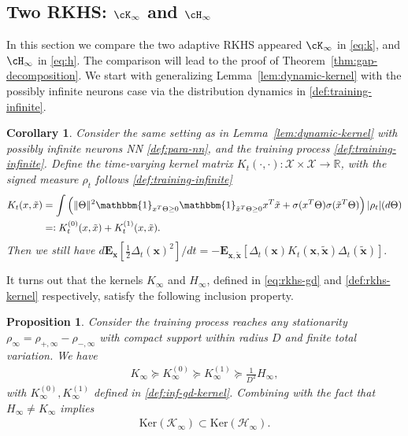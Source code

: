 \documentclass[11pt]{article}
\numberwithin{equation}{section}
\newtheorem{corollary}{Corollary}[section]
\newtheorem{proposition}{Proposition}[section]
\def\bd#1{\mathbf{#1}}
\begin{document}
\subsection{Two RKHS: $\cK_\infty$ and $\cH_\infty$}


In this section we compare the two adaptive RKHS appeared $\cK_\infty$ in \eqref{eq:k}, and $\cH_\infty$ in \eqref{eq:h}. The comparison will lead to the proof of Theorem~\ref{thm:gap-decomposition}. We start with generalizing Lemma~\ref{lem:dynamic-kernel} with the possibly infinite neurons case via the distribution dynamics in \eqref{def:training-infinite}.
    
    \begin{corollary}
        \label{cor:signed-kernel}
       Consider the same setting as in Lemma~\ref{lem:dynamic-kernel} with possibly infinite neurons NN \eqref{def:para-nn}, and the training process \eqref{def:training-infinite}. Define the time-varying kernel matrix $K_t(\cdot, \cdot): \mathcal{X} \times \mathcal{X} \rightarrow \mathbb{R}$, with the signed measure $\rho_t$ follows \eqref{def:training-infinite}
    \begin{align}\label{def:inf-gd-kernel}
        K_{t}(x,\tilde x) &= \int \left(\|\Theta\|^2\mathbbm{1}_{x^T\Theta\geq0}\mathbbm{1}_{\tilde x^T\Theta\geq0}x^T \tilde x + \sigma(x^T\Theta)\sigma(\tilde x^T\Theta) \right) |\rho_t|(d\Theta) \\
        & =: K_t^{(0)}(x,\tilde x) + K_t^{(1)}(x,\tilde x).
    \end{align}
        Then we still have 
    $
        d\mathbf{E}_{ \bd{ x}}\left[\frac{1}{2}\Delta_t(\bd{x})^2\right] / dt =  -\mathbf{E}_{\bd{x}, \bd{\tilde x}}\left[ \Delta_t(\bd{x})K_t(\bd{x}, \bd{\tilde x})\Delta_t(\bd{\tilde x})\right].
   $ 
    \end{corollary}



   It turns out that the kernels $K_\infty$ and $H_\infty$, defined in \eqref{eq:rkhs-gd} and \eqref{def:rkhs-kernel} respectively, satisfy the following inclusion property. 
    \begin{proposition}\label{prop:kernel-compare}
        Consider the training process reaches any stationarity $\rho_\infty = \rho_{+,\infty} - \rho_{-,\infty}$ with compact support within radius $D$ and finite total variation. We have 
        \begin{align}\label{ieq:pos-compare}
            K_{\infty} \succeq K_{\infty}^{(0)} \succeq K_{\infty}^{(1)} \succeq \frac{1}{D^2}H_\infty,
        \end{align}
        with $K_{\infty}^{(0)}, K_{\infty}^{(1)}$ defined in \eqref{def:inf-gd-kernel}. 
        Combining with the fact that $H_\infty \neq K_\infty$ implies
        \begin{align*}
            \text{Ker}( \mathcal{K}_\infty ) \subset  \text{Ker}( \mathcal{H}_\infty).
        \end{align*}
    \end{proposition}
\end{document}
